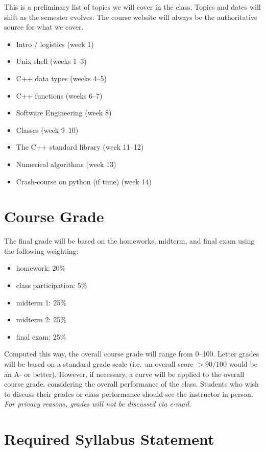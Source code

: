 \documentclass[10pt]{article}
\newenvironment{itemsquish}
  { \begin{itemize}
    \addtolength{\itemsep}{-0.25\baselineskip}
    \addtolength{\baselineskip}{-0.25\baselineskip} }
  { \end{itemize} }
\begin{document}
This is a preliminary list of topics we will cover in the class.
Topics and dates will shift as the semester evolves.  The course
website will always be the authoritative source for what we cover.

\begin{itemize}
  \item Intro / logistics (week 1)
  \item Unix shell (weeks 1--3)
  \item C++ data types (weeks 4--5)
  \item C++ functions (weeks 6--7)
  \item Software Engineering (week 8)
  \item Classes (week 9--10)
  \item The C++ standard library (week 11--12)
  \item Numerical algorithms (week 13)
  \item Crash-course on python (if time) (week 14)
\end{itemize}

\section{Course Grade}

The final grade will be based on the homeworks, midterm, and final
exam using the following weighting:
\begin{itemsquish}
\item homework: 20\%
\item class participation: 5\%
\item midterm 1: 25\%
\item midterm 2: 25\%
\item final exam: 25\%
\end{itemsquish}

Computed this way, the overall course grade will range from 0--100.
Letter grades will be based on a standard grade scale (i.e.\
an overall score $> 90/100$ would be an A- or better).  However, if
necessary, a curve will be applied to the overall course grade,
considering the overall performance of the class.
Students who wish to discuss their grades or class performance should
see the instructor in person.  {\em For privacy reasons, grades will
  not be discussed via e-mail.}

\section{Required Syllabus Statement}
\end{document}

